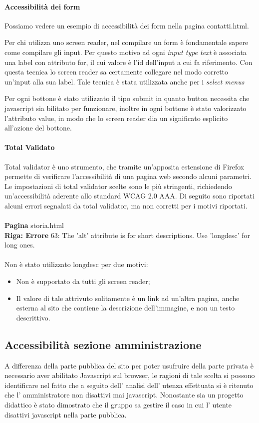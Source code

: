 \paragraph{Accessibilità dei form}

Possiamo vedere un esempio di accessibilità dei form nella pagina contatti.html.

Per chi utilizza uno screen reader, nel compilare un form è fondamentale sapere come compilare gli input. Per questo motivo ad ogni \emph{input type text} è associata una label con attributo for, il cui valore è l'id dell'input a cui fa riferimento. Con questa tecnica lo screen reader sa certamente collegare nel modo corretto un'input alla sua label.
Tale tecnica è stata utilizzata anche per i \emph{select menus}

Per ogni bottone è stato utilizzato il tipo submit in quanto button necessita che javascript sia bilitato per funzionare, inoltre in ogni bottone è stato valorizzato l'attributo value, in modo che lo screen reader dia un significato esplicito all'azione del bottone.

\paragraph{Total Validato}
Total validator è uno strumento, che tramite un'apposita estensione di Firefox permette di verificare l'accessibilità di una pagina web secondo alcuni parametri.
Le impostazioni di total validator scelte sono le più stringenti, richiedendo un'accessibilità aderente allo standard WCAG 2.0 AAA.
Di seguito sono riportati alcuni errori segnalati da total validator, ma non corretti per i motivi riportati.\\ \\
\textbf{Pagina} storia.html \\
\textbf{Riga: Errore} 63: The 'alt' attribute is for short descriptions. Use 'longdesc' for long ones. \\ \\
Non è stato utilizzato longdesc per due motivi:
\begin{itemize}
\item Non è supportato da tutti gli screen reader;
\item Il valore di tale attrivuto solitamente è un link ad un'altra pagina, anche esterna al sito che contiene la descrizione dell'immagine, e non un testo descrittivo.
\end{itemize}

\subsection{Accessibilità sezione amministrazione}
A differenza della parte pubblica del sito per poter usufruire della parte privata è necessario aver abilitato Javascript sul browser, le ragioni di tale scelta si possono identificare nel fatto che a seguito dell' analisi dell' utenza effettuata si è ritenuto che l' amministratore non disattivi mai javascript. Nonostante sia un progetto didattico è stato dimostrato che il gruppo sa gestire il caso in cui l' utente disattivi javascript nella parte pubblica.
